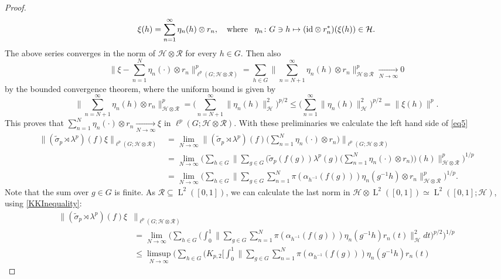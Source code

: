 \documentclass[12pt]{amsart}
\theoremstyle{definition}
\theoremstyle{remark}
\numberwithin{equation}{section}
\newcommand{\mc}{\mathcal}
\newcommand{\wt}{\widetilde}
\newcommand{\md}{d}
\DeclareMathOperator{\LL}{L}
\begin{document}
\begin{proof}
\[
\xi(h)=
\sum_{n=1}^{\infty}  \eta_n(h)\otimes r_n,\quad
\textnormal{where}\;\;\;
\eta_n\colon G\ni h\mapsto(\mathrm{id}\otimes   r_n^*) (\xi(h))\in \mc{H}.
\]
The above series converges in the norm of $\mc{H}\otimes \mc{R}$ for every $h\in G$. Then also
\[
\bigl\|\xi-\sum_{n=1}^{N} \eta_n(\cdot)\otimes r_n\bigr\|_{\ell^p(G;\mc{H}\otimes\mc{R})}^p
=
\sum_{h\in G} \bigl\|
\sum_{n=N+1}^{\infty} \eta_n(h)\otimes r_n\bigr\|_{\mc{H}\otimes \mc{R}}^p \xrightarrow[N\to\infty]{}0
\]
by the bounded convergence theorem, where the uniform bound is given by
\[
\bigl\|
\sum_{n=N+1}^{\infty} \eta_n(h)\otimes r_n\bigr\|_{\mc{H}\otimes \mc{R}}^p=
\bigl(\sum_{n=N+1}^{\infty} \bigl\|\eta_n(h)\bigr\|_{\mc{H}}^{2 }\bigr)^{p/2}\le
\bigl(\sum_{n=1}^{\infty} \bigl\|\eta_n(h)\bigr\|_{\mc{H}}^{2}\bigr)^{p/2}=
\|\xi(h)\|^{p}.
\]
This proves that $\sum_{n=1}^{N} \eta_n(\cdot)\otimes r_n\xrightarrow[N\to\infty]{}\xi$ in $\ell^p(G;\mc{H}\otimes\mc{R})$. With these preliminaries we calculate the left hand side of \eqref{eq5}
\begin{align*}
\|(\wt{\sigma}_p\rtimes\lambda^p)(f) \xi\|_{\ell^p(G;\mc{H}\otimes \mc{R})}&=
\lim_{N\to\infty}
\bigl\|(\wt{\sigma}_p\rtimes\lambda^p)(f)
\bigl(
\sum_{n=1}^{N} \eta_n(\cdot)\otimes r_n
\bigr)
\bigr\|_{\ell^p(G;\mc{H}\otimes \mc{R})}
\\
&=
\lim_{N\to\infty}
\bigl(
\sum_{h\in G}
\bigl\|
\sum_{g\in G}
\bigl(
\wt{\sigma}_p(f(g))\lambda^p(g)
\bigl(\sum_{n=1}^{N}\eta_n(\cdot)\otimes r_n\bigr)
\bigr)(h)\bigr\|^p_{\mc{H}\otimes\mc{R}}\bigr)^{1/p}\\
&=
\lim_{N\to\infty}
\bigl(
\sum_{h\in G}
\bigl\|
\sum_{g\in G}
\sum_{n=1}^{N}
 \pi (\alpha_{h^{-1}}(f(g)))
\eta_n(g^{-1}h)\otimes r_n
\bigr\|^p_{\mc{H}\otimes\mc{R}}\bigr)^{1/p}.
\end{align*}
Note that the sum over $g\in G$ is finite. As $\mc{R}\subseteq \LL^2([0,1])$, we can calculate the last norm in $\mc{H}\otimes \LL^2([0,1])\simeq \LL^2([0,1]; \mc{H})$, using \eqref{KKInequality}:
\begin{align*}
\|(\wt{\sigma}_p\rtimes\lambda^p)(f) \xi&\|_{\ell^p(G;\mc{H}\otimes \mc{R})}\\
&= \lim_{N\to\infty}
\bigl(
\sum_{h\in G}
\bigl(
\int_{0}^{1}
\bigl\|
\sum_{g\in G}
\sum_{n=1}^{N}
 \pi (\alpha_{h^{-1}}(f(g)))
\eta_n(g^{-1}h)r_n(t)
\bigr\|^2_{\mc{H}}
\md t
\bigr)^{p/2}\bigr)^{1/p}\\
&\le
\limsup_{N\to\infty}
\bigl(
\sum_{h\in G}
\bigl(
K_{p,2}
\bigl[
\int_{0}^{1}
\bigl\|
\sum_{g\in G}
\sum_{n=1}^{N}
 \pi(\alpha_{h^{-1}}(f(g)))
\eta_n(g^{-1}h)r_n(t)

\end{align*}
\end{proof}
\end{document}

